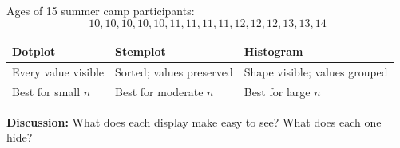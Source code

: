 \documentclass[aspectratio=169, 11pt]{beamer}
\begin{document}
{
\begin{frame}[t, plain]
  \hspace{0.55cm}%
  \begin{minipage}{0.9\textwidth}
    \vspace{0.2em}\small
    Ages of 15 summer camp participants:
    \[10,10,10,10,10,11,11,11,11,12,12,12,13,13,14\]

    \vspace{0.3cm}
    \begin{tabular}{p{} p{} p{}}
    \textbf{Dotplot} & \textbf{Stemplot} & \textbf{Histogram} \\
    \hline
    Every value visible & Sorted; values preserved & Shape visible; values grouped \\
    Best for small $n$ & Best for moderate $n$ & Best for large $n$ \\
    \end{tabular}

    \vspace{0.5cm}
    {\color{navy}\bfseries\small Discussion:} What does each display make easy to see?
    What does each one hide?
  \end{minipage}
\end{frame}
}
\end{document}
